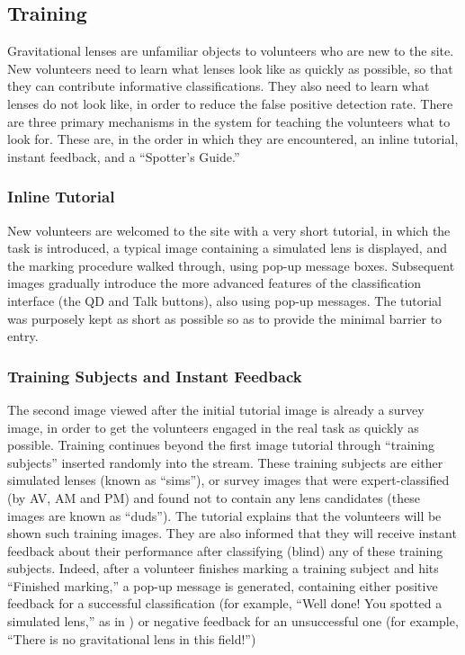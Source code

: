 \documentclass[useAMS,usenatbib,a4paper]{mn2e}
\begin{document}

\subsection{Training}
\label{sec:design:training}

Gravitational lenses are unfamiliar objects to volunteers who are new
to the site. New volunteers need to learn what lenses look like as quickly as
possible, so that they can contribute informative classifications. They also
need to learn what lenses do not look like, in order to reduce the false
positive detection rate. There are three primary mechanisms in the \sw system
for teaching the volunteers what to look for. These are, in the order in which
they are encountered, an inline tutorial, instant feedback,
and a ``Spotter's Guide.''

\subsubsection{Inline Tutorial}

New volunteers are welcomed to the site with a very short tutorial, in which
the task is introduced, a typical image containing a simulated lens is
displayed, and the marking procedure walked through, using pop-up message
boxes. Subsequent images gradually introduce the more advanced
features of the classification interface (the QD and Talk buttons), also using
pop-up messages. The tutorial was purposely kept as short as possible so as to
provide the minimal barrier to entry.

\subsubsection{Training Subjects and Instant Feedback}

The second image viewed after the initial tutorial image is already a survey
image, in order to get the volunteers engaged in the real task as quickly as
possible. Training continues beyond the first image tutorial through
``training subjects'' inserted randomly into the stream.  These training
subjects are either simulated lenses (known as ``sims''), or survey images
that were expert-classified (by AV, AM and PM) and found not to contain any
lens candidates (these images are known as ``duds''). The tutorial explains
that the volunteers  will be shown such training images. They are also
informed that they will receive instant feedback about their performance after
classifying (blind) any of these training subjects. Indeed, after a volunteer
finishes marking a training subject and hits ``Finished marking,'' a pop-up
message is generated, containing either positive feedback for a successful
classification (for example, ``Well done! You spotted a simulated lens,'' as
in ) or negative feedback for an unsuccessful one (for
example, ``There is no gravitational lens in this field!'') 
\end{document}
